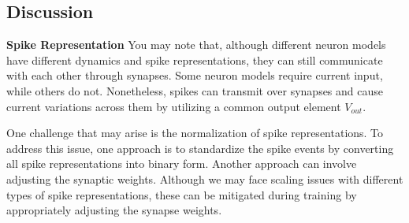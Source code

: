 \subsection{Discussion}

\textbf{Spike Representation}
You may note that, although different neuron models have different dynamics and spike 
representations, they can still communicate with each other through synapses. Some neuron
 models require current input, while others do not. Nonetheless, spikes can transmit 
 over synapses and cause current variations across them by utilizing a common output element $V_{out}$. 
 
 One challenge that may arise is the normalization of spike representations.
To address this issue, one approach is to standardize the spike events by converting all
 spike representations into binary form. Another approach can involve adjusting the synaptic weights.
  Although we may face scaling issues with different types of spike representations, these
   can be mitigated during training by appropriately adjusting the synapse weights.


